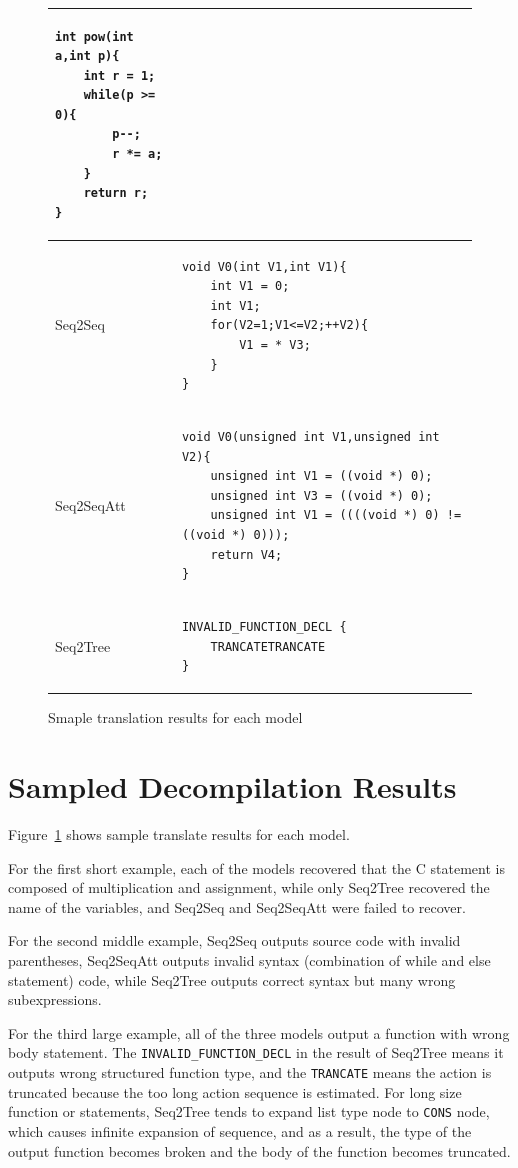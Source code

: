\documentclass[senior,final,11pt]{iscs-thesis}
\begin{document}
\begin{figure}
\begin{tabular}{|l|l|}
		\begin{lstlisting}[style=Csample]
int pow(int a,int p){
	int r = 1;
	while(p >= 0){
		p--;
		r *= a;
	}
	return r;
}
		\end{lstlisting} \\ \hline
		Seq2Seq & 
		\begin{lstlisting}[style=Csample]
void V0(int V1,int V1){ 
	int V1 = 0; 
	int V1; 
	for(V2=1;V1<=V2;++V2){ 
		V1 = * V3; 
	} 
}
		\end{lstlisting} \\ \hline
		Seq2SeqAtt & 
		\begin{lstlisting}[style=Csample]
void V0(unsigned int V1,unsigned int V2){ 
	unsigned int V1 = ((void *) 0); 
	unsigned int V3 = ((void *) 0); 
	unsigned int V1 = ((((void *) 0) != ((void *) 0))); 
	return V4; 
}
	\end{lstlisting} \\ \hline
		Seq2Tree & 
		\begin{lstlisting}[style=Csample]
INVALID_FUNCTION_DECL { 
	TRANCATETRANCATE 
}
		\end{lstlisting}
		 \\ \hline	
	\end{tabular}
	\caption{Smaple translation results for each model}
	\label{fig:sampletranse}
\end{figure}


\section{Sampled Decompilation Results}

Figure~\ref{fig:sampletranse} shows sample translate results for each model.

For the first short example, each of the models recovered that the C statement is composed of multiplication and assignment,
while only Seq2Tree recovered the name of the variables, and Seq2Seq and Seq2SeqAtt were failed to recover.

For the second middle example, Seq2Seq outputs source code with invalid parentheses, Seq2SeqAtt outputs invalid syntax (combination of while and else statement) code,
while Seq2Tree outputs correct syntax but many wrong subexpressions.

For the third large example, all of the three models output a function with wrong body statement.
The \texttt{INVALID\_FUNCTION\_DECL} in the result of Seq2Tree means it outputs wrong structured function type, and the \texttt{TRANCATE} means 
the action is truncated because the too long action sequence is estimated. 
For long size function or statements, Seq2Tree tends to expand list type node to \texttt{CONS} node, which causes infinite expansion of sequence,
and as a result, the type of the output function becomes broken and the body of the function becomes truncated.
\end{document}

